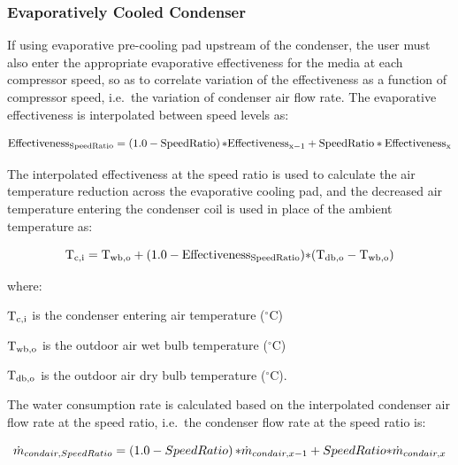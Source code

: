 \subsubsection{Evaporatively Cooled Condenser}\label{evaporatively-cooled-condenser}

If using evaporative pre-cooling pad upstream of the condenser, the user must also enter the appropriate evaporative effectiveness for the media at each compressor speed, so as to correlate variation of the effectiveness as a function of compressor speed, i.e.~the variation of condenser air flow rate. The evaporative effectiveness is interpolated between speed levels as:

\begin{equation}
{\rm{Effectivenes}}{{\rm{s}}_{{\rm{SpeedRatio}}}} = \left( {1.0 - {\rm{SpeedRatio}}} \right){\rm{*Effectivenes}}{{\rm{s}}_{{\rm{x}} - 1}} + {\rm{SpeedRatio*Effectivenes}}{{\rm{s}}_{\rm{x}}}
\end{equation}

The interpolated effectiveness at the speed ratio is used to calculate the air temperature reduction across the evaporative cooling pad, and the decreased air temperature entering the condenser coil is used in place of the ambient temperature as:

\begin{equation}
{{\rm{T}}_{{\rm{c}},{\rm{i}}}} = {{\rm{T}}_{{\rm{wb}},{\rm{o}}}} + (1.0 - {\rm{Effectivenes}}{{\rm{s}}_{{\rm{SpeedRatio}}}}){\rm{*}}({{\rm{T}}_{{\rm{db}},{\rm{o}}}} - {{\rm{T}}_{{\rm{wb}},{\rm{o}}}})
\end{equation}

where:

\({{\rm{T}}_{{\rm{c}},{\rm{i}}}}\) is the condenser entering air temperature (\(^{\circ}\)C)

\({{\rm{T}}_{{\rm{wb}},{\rm{o}}}}\) is the outdoor air wet bulb temperature (\(^{\circ}\)C)

\({{\rm{T}}_{{\rm{db}},{\rm{o}}}}\) is the outdoor air dry bulb temperature (\(^{\circ}\)C).

The water consumption rate is calculated based on the interpolated condenser air flow rate at the speed ratio, i.e.~the condenser flow rate at the speed ratio is:

\begin{equation}
{\dot m_{condair,{\rm{}}SpeedRatio}} = \left( {1.0 - SpeedRatio} \right){\rm{*}}{\dot m_{condair,{\rm{}}x - 1}} + SpeedRatio{\rm{*}}{\dot m_{condair,{\rm{}}x}}
\end{equation}

